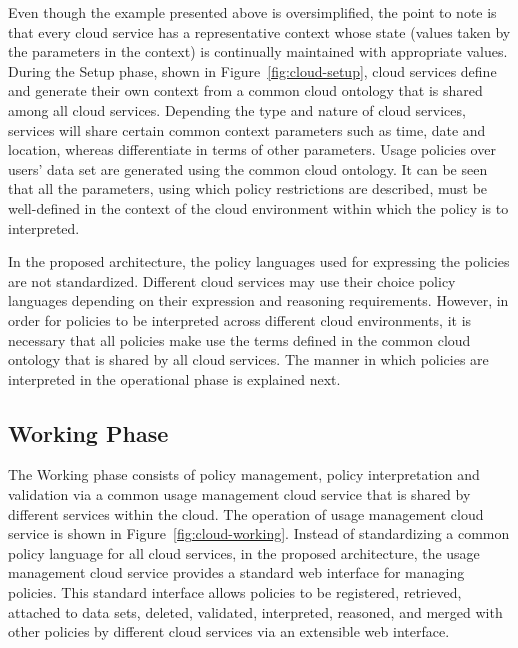 \documentclass[10pt,letterpaper]{book}
\begin{document}
Even though the example presented above is oversimplified, the point to note is that every cloud service has a representative context whose state (values taken by the parameters in the context) is continually maintained with appropriate values. During the Setup phase, shown in Figure~\ref{fig:cloud-setup}, cloud services define and generate their own context from a common cloud ontology that is shared among all cloud services. Depending the type and nature of cloud services, services will share certain common context parameters such as time, date and location, whereas differentiate in terms of other parameters. Usage policies over users' data set are generated using the common cloud ontology. It can be seen that all the parameters, using which policy restrictions are described, must be well-defined in the context of the cloud environment within which the policy is to interpreted.

In the proposed architecture, the policy languages used for expressing the policies are not standardized. Different cloud services may use their choice policy languages depending on their expression and reasoning requirements. However, in order for policies to be interpreted across different cloud environments, it is necessary that all policies make use the terms defined in the common cloud ontology that is shared by all cloud services. The manner in which policies are interpreted in the operational phase is explained next. 

\subsection{Working Phase}
The Working phase consists of policy management, policy interpretation and validation via a common usage management cloud service that is shared by different services within the cloud. The operation of usage management cloud service is shown in Figure~\ref{fig:cloud-working}. Instead of standardizing a common policy language for all cloud services, in the proposed architecture, the usage management cloud service provides a standard web interface for managing policies. This standard interface allows policies to be registered, retrieved, attached to data sets, deleted, validated, interpreted, reasoned, and merged with other policies by different cloud services via an extensible web interface. 
\end{document}

